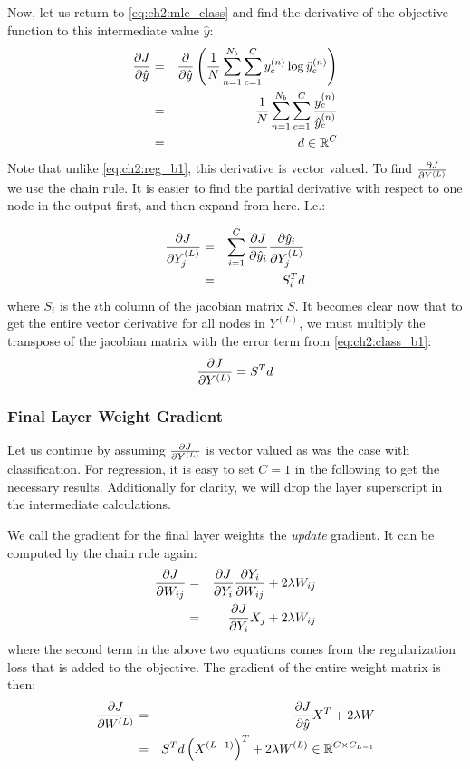 Now, let us return to \eqref{eq:ch2:mle_class} and find the derivative of the
objective function to this intermediate value $\hat{y}$:
\begin{eqnarray}
  \dydx{J}{\hat{y}} &= & \dydx{}{\hat{y}} \left( \frac{1}{N}\sum_{n=1}^{N_b} \sum_{c=1}^C 
  y^{(n)}_c \log \hat{y}^{(n)}_c \right) \\
  &=& \frac{1}{N}\sum_{n=1}^{N_b} \sum_{c=1}^C \frac{y^{(n)}_c}{\hat{y}^{(n)}_c} \\
  &=& d \in \reals[C] \label{eq:ch2:class_b1}
\end{eqnarray}
Note that unlike \eqref{eq:ch2:reg_b1}, this derivative is vector valued. To
find $\dydx{J}{Y^{(L)}}$ we use the chain rule. It is easier to find the
partial derivative with respect to one node in the output first, and then expand
from here. I.e.:

\begin{eqnarray}
  \dydx{J}{Y^{(L)}_j} &=& \sum_{i=1}^C \dydx{J}{\hat{y}_i}\dydx{\hat{y}_i}{Y^{(L)}_j} \\
                      &=& S_i^T d
\end{eqnarray}
where $S_i$ is the $i$th column of the jacobian matrix $S$. It becomes clear now
that to get the entire vector derivative for all nodes in $Y^{(L)}$, we must
multiply the transpose of the jacobian matrix with the error term from
\eqref{eq:ch2:class_b1}:
\begin{equation}
  \dydx{J}{Y^{(L)}} = S^T d
\end{equation}

\subsubsection{Final Layer Weight Gradient} \label{sec:ch2:weight}
Let us continue by assuming $\dydx{J}{Y^{(L)}}$ is vector valued as was the case
with classification. For regression, it is easy to set $C=1$ in the following to
get the necessary results. Additionally for clarity, we will drop the layer
superscript in the intermediate calculations.

We call the gradient for the final layer weights the \emph{update} gradient. 
It can be computed by the chain rule again:
\begin{eqnarray}
  \dydx{J}{W_{ij}} &=& \dydx{J}{Y_i} \dydx{Y_i}{W_{ij}} + 2\lambda W_{ij} \\
  &=& \dydx{J}{Y_i} X_j + 2\lambda W_{ij}
\end{eqnarray}
where the second term in the above two equations comes from the regularization
loss that is added to the objective. The gradient of the entire weight matrix is 
then:
\begin{eqnarray}
  \dydx{J}{W^{(L)}} &=& \dydx{J}{\hat{y}} X^T +2\lambda W \\
   &=& S^T d \left(X^{(L-1)}\right)^T + 2\lambda W^{(L)} \in \reals[C \x C_{L-1}]
\end{eqnarray}

